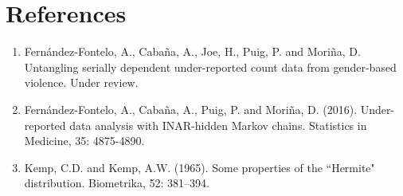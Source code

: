 \documentclass[11pt,a4paper]{article}
\begin{document}
\section*{References}

\begin{enumerate}
\item Fern\'andez-Fontelo, A., Caba\~na, A., Joe, H., Puig, P. and Mori\~na, D. Untangling serially dependent under-reported count data from gender-based violence. Under review. 
\item Fern\'andez-Fontelo, A., Caba\~na, A., Puig, P. and Mori\~na, D. (2016). Under-reported data analysis with INAR-hidden Markov chains. Statistics in Medicine, 35: 4875-4890.
\item Kemp, C.D. and Kemp, A.W. (1965). Some properties of the ``Hermite" distribution. Biometrika, 52: 381–394.
\end{enumerate}
\end{document}
